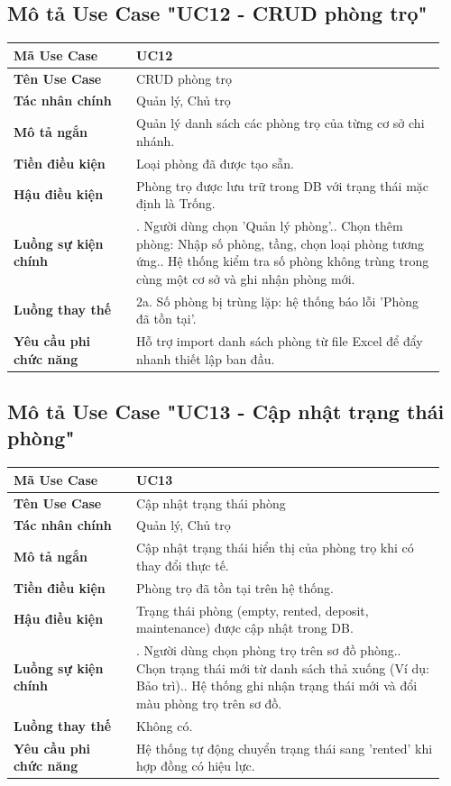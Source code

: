 \documentclass[a4paper,oneside]{report}
\begin{document}
\subsection{Mô tả Use Case "UC12 - CRUD phòng trọ"}

\begin{longtable}[]{@{}>{\RaggedRight\arraybackslash}p{0.27\linewidth}>{\RaggedRight\arraybackslash}p{0.68\linewidth}@{}}
\toprule
\textbf{Mã Use Case} & UC12\tabularnewline
\midrule
\endhead
\textbf{Tên Use Case} & CRUD phòng trọ\tabularnewline
\textbf{Tác nhân chính} & Quản lý, Chủ trọ\tabularnewline
\textbf{Mô tả ngắn} & Quản lý danh sách các phòng trọ của từng cơ sở chi
nhánh.\tabularnewline
\textbf{Tiền điều kiện} & Loại phòng đã được tạo sẵn.\tabularnewline
\textbf{Hậu điều kiện} & Phòng trọ được lưu trữ trong DB với trạng thái
mặc định là Trống.\tabularnewline
\textbf{Luồng sự kiện chính} & 1. Người dùng chọn
'Quản lý phòng'.\newline 2. Chọn thêm phòng: Nhập số phòng, tầng,
chọn loại phòng tương ứng.\newline 3. Hệ thống kiểm tra số phòng
không trùng trong cùng một cơ sở và ghi nhận phòng mới.\tabularnewline
\textbf{Luồng thay thế} & 2a. Số phòng bị trùng lặp: hệ thống báo lỗi
'Phòng đã tồn tại'.\tabularnewline
\textbf{Yêu cầu phi chức năng} & Hỗ trợ import danh sách phòng từ file
Excel để đẩy nhanh thiết lập ban đầu.\tabularnewline
\bottomrule
\end{longtable}

\subsection{Mô tả Use Case "UC13 - Cập nhật trạng thái phòng"}

\begin{longtable}[]{@{}>{\RaggedRight\arraybackslash}p{0.27\linewidth}>{\RaggedRight\arraybackslash}p{0.68\linewidth}@{}}
\toprule
\textbf{Mã Use Case} & UC13\tabularnewline
\midrule
\endhead
\textbf{Tên Use Case} & Cập nhật trạng thái phòng\tabularnewline
\textbf{Tác nhân chính} & Quản lý, Chủ trọ\tabularnewline
\textbf{Mô tả ngắn} & Cập nhật trạng thái hiển thị của phòng trọ khi có
thay đổi thực tế.\tabularnewline
\textbf{Tiền điều kiện} & Phòng trọ đã tồn tại trên hệ
thống.\tabularnewline
\textbf{Hậu điều kiện} & Trạng thái phòng (empty, rented, deposit,
maintenance) được cập nhật trong DB.\tabularnewline
\textbf{Luồng sự kiện chính} & 1. Người dùng chọn
phòng trọ trên sơ đồ phòng.\newline 2. Chọn trạng thái mới từ danh
sách thả xuống (Ví dụ: Bảo trì).\newline 3. Hệ thống ghi nhận trạng
thái mới và đổi màu phòng trọ trên sơ đồ.\tabularnewline
\textbf{Luồng thay thế} & Không có.\tabularnewline
\textbf{Yêu cầu phi chức năng} & Hệ thống tự động chuyển trạng thái sang
'rented' khi hợp đồng có hiệu lực.\tabularnewline
\bottomrule
\end{longtable}
\end{document}
